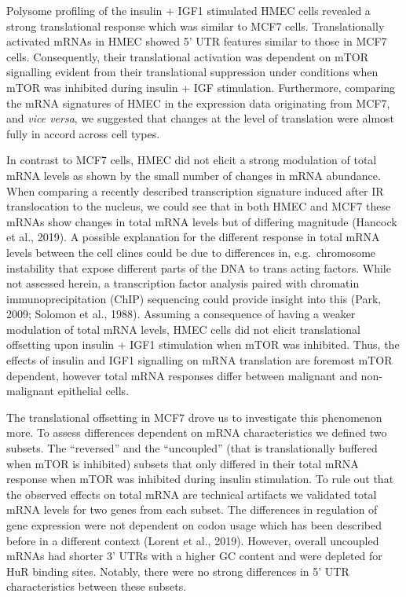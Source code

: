 \documentclass[
  12pt,
  openany]{book}
\begin{document}
Polysome profiling of the insulin + IGF1 stimulated HMEC cells revealed a strong translational response which was similar to MCF7 cells. Translationally activated mRNAs in HMEC showed 5' UTR features similar to those in MCF7 cells. Consequently, their translational activation was dependent on mTOR signalling evident from their translational suppression under conditions when mTOR was inhibited during insulin + IGF stimulation. Furthermore, comparing the mRNA signatures of HMEC in the expression data originating from MCF7, and \emph{vice versa}, we suggested that changes at the level of translation were almost fully in accord across cell types.

In contrast to MCF7 cells, HMEC did not elicit a strong modulation of total mRNA levels as shown by the small number of changes in mRNA abundance. When comparing a recently described transcription signature induced after IR translocation to the nucleus, we could see that in both HMEC and MCF7 these mRNAs show changes in total mRNA levels but of differing magnitude (Hancock et al., 2019). A possible explanation for the different response in total mRNA levels between the cell clines could be due to differences in, e.g.~chromosome instability that expose different parts of the DNA to trans acting factors. While not assessed herein, a transcription factor analysis paired with chromatin immunoprecipitation (ChIP) sequencing could provide insight into this (Park, 2009; Solomon et al., 1988). Assuming a consequence of having a weaker modulation of total mRNA levels, HMEC cells did not elicit translational offsetting upon insulin + IGF1 stimulation when mTOR was inhibited. Thus, the effects of insulin and IGF1 signalling on mRNA translation are foremost mTOR dependent, however total mRNA responses differ between malignant and non-malignant epithelial cells.

The translational offsetting in MCF7 drove us to investigate this phenomenon more. To assess differences dependent on mRNA characteristics we defined two subsets. The ``reversed'' and the ``uncoupled'' (that is translationally buffered when mTOR is inhibited) subsets that only differed in their total mRNA response when mTOR was inhibited during insulin stimulation. To rule out that the observed effects on total mRNA are technical artifacts we validated total mRNA levels for two genes from each subset. The differences in regulation of gene expression were not dependent on codon usage which has been described before in a different context (Lorent et al., 2019). However, overall uncoupled mRNAs had shorter 3' UTRs with a higher GC content and were depleted for HuR binding sites. Notably, there were no strong differences in 5' UTR characteristics between these subsets.
\end{document}

